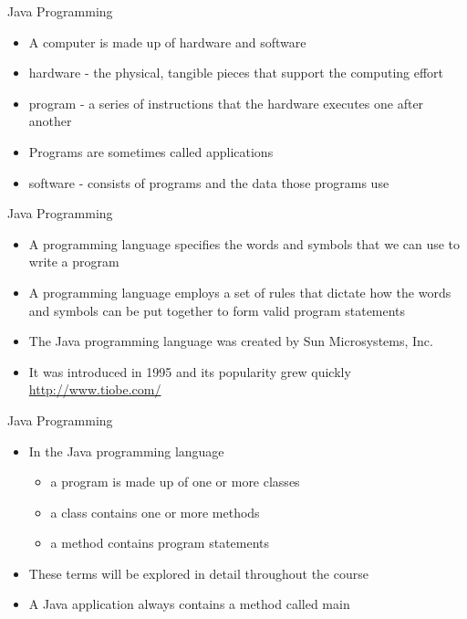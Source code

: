 \documentclass{beamer}
\begin{document}
\begin{frame}{Java Programming}
\begin{itemize}
\item A computer is made up of hardware and software
\item hardware - the physical, tangible pieces that support the computing effort
\item program - a series of instructions that the hardware executes one after another
\item Programs are sometimes called applications
\item software - consists of programs and the data those programs use
\end{itemize}
\end{frame}

\begin{frame}{Java Programming}
\begin{itemize}
\item A programming language specifies the words and symbols that we can use to write a program
\item A programming language employs a set of rules that dictate how the words and symbols can be put together to form valid program statements
\item The Java programming language was created by Sun Microsystems, Inc.
\item It was introduced in 1995 and its popularity grew quickly \url{http://www.tiobe.com/}
\end{itemize}
\end{frame}

\begin{frame}{Java Programming}
\begin{itemize}
\item In the Java programming language
\begin{itemize}
\item a program is made up of one or more classes
\item a class contains one or more methods
\item a method contains program statements
\end{itemize}
\item These terms will be explored in detail throughout the course
\item A Java application always contains a method called main
\end{itemize}
\end{frame}
\end{document}
